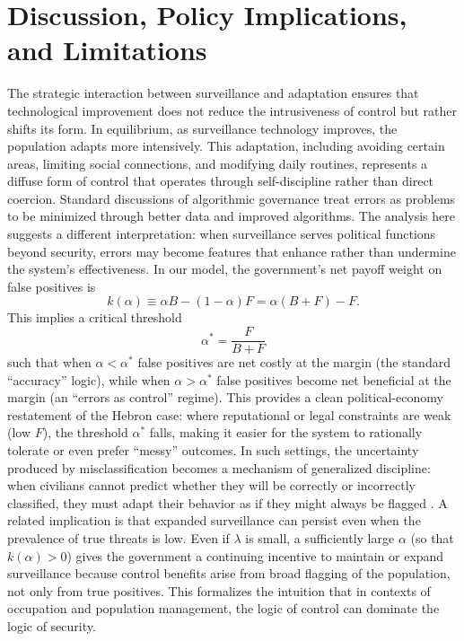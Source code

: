 \documentclass[11pt,a4paper]{article}
\theoremstyle{definition}
\theoremstyle{remark}
\theoremstyle{definition}
\begin{document}
\section{Discussion, Policy Implications, and Limitations}

The strategic interaction between surveillance and adaptation ensures that technological improvement does not reduce the intrusiveness of control 
but rather shifts its form. In equilibrium, as surveillance technology improves, the population adapts more intensively. This adaptation, including 
avoiding certain areas, limiting social connections, and modifying daily routines, represents a diffuse form of control that operates through self-discipline 
rather than direct coercion. Standard discussions of algorithmic governance treat errors as problems to be minimized through better data and improved 
algorithms. The analysis here suggests a different interpretation: when surveillance serves political functions beyond security, errors may become features 
that enhance rather than undermine the system's effectiveness. In our model, the government's net payoff weight on false positives is
$$
k(\alpha)\equiv \alpha B-(1-\alpha)F=\alpha(B+F)-F.
$$
This implies a critical threshold
$$
\alpha^*=\frac{F}{B+F}
$$
such that when $\alpha<\alpha^*$ false positives are net costly at the margin (the standard ``accuracy'' logic), while when $\alpha>\alpha^*$ 
false positives become net beneficial at the margin (an ``errors as control'' regime). This provides a clean political-economy restatement of 
the Hebron case: where reputational or legal constraints are weak (low $F$), the threshold $\alpha^*$ falls, making it easier for the system to 
rationally tolerate or even prefer ``messy'' outcomes. In such settings, the uncertainty produced by misclassification becomes a mechanism of 
generalized discipline: when civilians cannot predict whether they will be correctly or incorrectly classified, they must adapt their behavior 
as if they might always be flagged \citep{goodfriend2023algorithmic}. A related implication is that expanded surveillance can persist even when 
the prevalence of true threats is low. Even if $\lambda$ is small, a sufficiently large $\alpha$ (so that $k(\alpha)>0$) gives the government a 
continuing incentive to maintain or expand surveillance because control benefits arise from broad flagging of the population, not only from true positives. 
This formalizes the intuition that in contexts of occupation and population management, the logic of control can dominate the logic of security.
\end{document}
